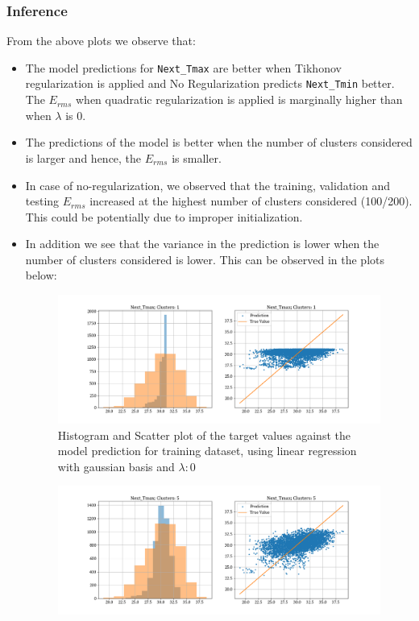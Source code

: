 \documentclass[12pt,a4paper]{article}
\newcommand{\noi}{\noindent}
\def\tt#1{\texttt{#1}}
\begin{document}
\noi


\subsubsection{Inference}
From the above plots we observe that:
\begin{itemize}
    \itemsep0em
    \item The model predictions for \tt{Next\_Tmax} are better when Tikhonov regularization is applied and No Regularization predicts \tt{Next\_Tmin} better. The $E_{rms}$ when quadratic regularization is applied is marginally higher than when $\lambda$ is 0.
    \item The predictions of the model is better when the number of clusters considered is larger and hence, the $E_{rms}$ is smaller.
    \item In case of no-regularization, we observed that the training, validation and testing $E_{rms}$ increased at the highest number of clusters considered (100/200). This could be potentially due to improper initialization.
    \item In addition we see that the variance in the prediction is lower when the number of clusters considered is lower. This can be observed in the plots below:
    \begin{figure}[H]
        \centering
        \includegraphics[scale=0.4]{images/t3_d3/no_reg/T_max_nclu_1.png}
        \caption{Histogram and Scatter plot of the target values against the model prediction for training dataset, using linear regression with gaussian basis and $\lambda: 0$}
    \end{figure}
    \begin{figure}[H]
        \centering
        \includegraphics[scale=0.4]{images/t3_d3/no_reg/T_max_nclu_5.png}

\end{figure}
\end{itemize}
\end{document}
